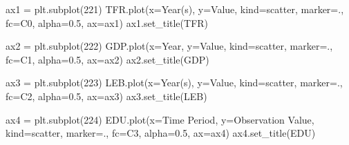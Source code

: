\documentclass[
  letterpaper,
  DIV=11,
  numbers=noendperiod]{scrreprt}
\newenvironment{Shaded}{\begin{snugshade}}{\end{snugshade}}
\newcommand{\DecValTok}[1]{\textcolor[rgb]{0.68,0.00,0.00}{#1}}
\newcommand{\FloatTok}[1]{\textcolor[rgb]{0.68,0.00,0.00}{#1}}
\newcommand{\NormalTok}[1]{\textcolor[rgb]{0.00,0.23,0.31}{#1}}
\newcommand{\OperatorTok}[1]{\textcolor[rgb]{0.37,0.37,0.37}{#1}}
\newcommand{\StringTok}[1]{\textcolor[rgb]{0.13,0.47,0.30}{#1}}
\begin{document}
\begin{Shaded}
\begin{Highlighting}[]
\NormalTok{ax1 }\OperatorTok{=}\NormalTok{ plt.subplot(}\DecValTok{221}\NormalTok{)}
\NormalTok{TFR.plot(x}\OperatorTok{=}\StringTok{\textquotesingle{}Year(s)\textquotesingle{}}\NormalTok{, y}\OperatorTok{=}\StringTok{\textquotesingle{}Value\textquotesingle{}}\NormalTok{, kind}\OperatorTok{=}\StringTok{\textquotesingle{}scatter\textquotesingle{}}\NormalTok{, marker}\OperatorTok{=}\StringTok{\textquotesingle{}.\textquotesingle{}}\NormalTok{, fc}\OperatorTok{=}\StringTok{\textquotesingle{}C0\textquotesingle{}}\NormalTok{, alpha}\OperatorTok{=}\FloatTok{0.5}\NormalTok{, ax}\OperatorTok{=}\NormalTok{ax1)}
\NormalTok{ax1.set\_title(}\StringTok{\textquotesingle{}TFR\textquotesingle{}}\NormalTok{)}

\NormalTok{ax2 }\OperatorTok{=}\NormalTok{ plt.subplot(}\DecValTok{222}\NormalTok{)}
\NormalTok{GDP.plot(x}\OperatorTok{=}\StringTok{\textquotesingle{}Year\textquotesingle{}}\NormalTok{, y}\OperatorTok{=}\StringTok{\textquotesingle{}Value\textquotesingle{}}\NormalTok{, kind}\OperatorTok{=}\StringTok{\textquotesingle{}scatter\textquotesingle{}}\NormalTok{, marker}\OperatorTok{=}\StringTok{\textquotesingle{}.\textquotesingle{}}\NormalTok{, fc}\OperatorTok{=}\StringTok{\textquotesingle{}C1\textquotesingle{}}\NormalTok{, alpha}\OperatorTok{=}\FloatTok{0.5}\NormalTok{, ax}\OperatorTok{=}\NormalTok{ax2)}
\NormalTok{ax2.set\_title(}\StringTok{\textquotesingle{}GDP\textquotesingle{}}\NormalTok{)}

\NormalTok{ax3 }\OperatorTok{=}\NormalTok{ plt.subplot(}\DecValTok{223}\NormalTok{)}
\NormalTok{LEB.plot(x}\OperatorTok{=}\StringTok{\textquotesingle{}Year(s)\textquotesingle{}}\NormalTok{, y}\OperatorTok{=}\StringTok{\textquotesingle{}Value\textquotesingle{}}\NormalTok{, kind}\OperatorTok{=}\StringTok{\textquotesingle{}scatter\textquotesingle{}}\NormalTok{, marker}\OperatorTok{=}\StringTok{\textquotesingle{}.\textquotesingle{}}\NormalTok{, fc}\OperatorTok{=}\StringTok{\textquotesingle{}C2\textquotesingle{}}\NormalTok{, alpha}\OperatorTok{=}\FloatTok{0.5}\NormalTok{, ax}\OperatorTok{=}\NormalTok{ax3)}
\NormalTok{ax3.set\_title(}\StringTok{\textquotesingle{}LEB\textquotesingle{}}\NormalTok{)}

\NormalTok{ax4 }\OperatorTok{=}\NormalTok{ plt.subplot(}\DecValTok{224}\NormalTok{)}
\NormalTok{EDU.plot(x}\OperatorTok{=}\StringTok{\textquotesingle{}Time Period\textquotesingle{}}\NormalTok{, y}\OperatorTok{=}\StringTok{\textquotesingle{}Observation Value\textquotesingle{}}\NormalTok{, kind}\OperatorTok{=}\StringTok{\textquotesingle{}scatter\textquotesingle{}}\NormalTok{, marker}\OperatorTok{=}\StringTok{\textquotesingle{}.\textquotesingle{}}\NormalTok{, fc}\OperatorTok{=}\StringTok{\textquotesingle{}C3\textquotesingle{}}\NormalTok{, alpha}\OperatorTok{=}\FloatTok{0.5}\NormalTok{, ax}\OperatorTok{=}\NormalTok{ax4)}
\NormalTok{ax4.set\_title(}\StringTok{\textquotesingle{}EDU\textquotesingle{}}\NormalTok{)}


\end{Highlighting}
\end{Shaded}
\end{document}
